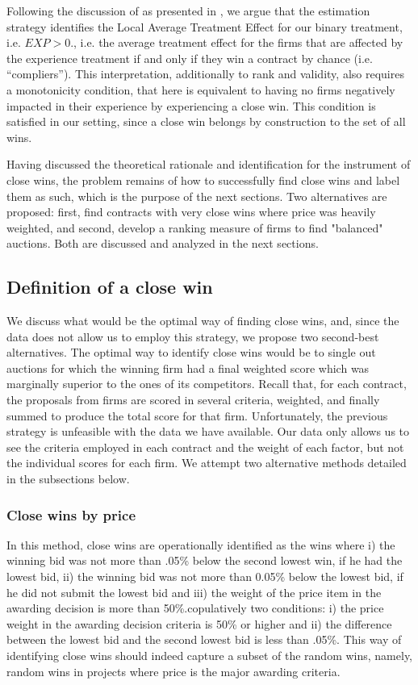  Following the discussion of \parencite{angrist1995identification} as presented in \parencite{hansen2009econometrics}, we argue that the estimation strategy identifies the Local Average Treatment Effect for our binary treatment, i.e. $EXP>0$., i.e. the average treatment effect for the firms that are affected by the experience treatment if and only if they win a contract by chance (i.e. “compliers”). This interpretation, additionally to rank and validity, also requires a monotonicity condition, that here is equivalent to having no firms negatively impacted in their experience by experiencing a close win. This condition is satisfied in our setting, since a close win belongs by construction to the set of all wins.

Having discussed the theoretical rationale and identification for the instrument of close wins, the problem remains of how to successfully find close wins and label them as such, which is the purpose of the next sections. Two alternatives are proposed: first, find contracts with very close wins where price was heavily weighted, and second, develop a ranking measure of firms to find "balanced" auctions. Both are discussed and analyzed in the next sections.

\subsection{Definition of a close win}
We discuss what would be the optimal way of finding close wins, and, since the data does not allow us to employ this strategy, we propose two second-best alternatives.
The optimal way to identify close wins would be to single out auctions for which the winning firm had a final weighted score which was marginally superior to the ones of its competitors.  Recall that, for each contract, the  proposals from firms are scored in several criteria, weighted, and finally summed to produce the total score for that firm. Unfortunately, the previous strategy is unfeasible with the data we have available. Our data only allows us to see the criteria employed in each contract and the weight of each factor, but not the individual scores for each firm. We attempt two alternative methods detailed in the subsections below.

\subsubsection{Close wins by price}
In this method, close wins are operationally identified as the wins where i) the winning bid  was not more than .05\% below the second lowest win, if he had the lowest bid, ii) the winning bid  was not more than 0.05\% below the lowest bid, if he did not submit the lowest bid and iii) the weight of the price item in the awarding decision is more than 50\%.copulatively  two conditions: i) the price weight in the awarding decision criteria is 50\% or higher and ii) the difference between the lowest bid and the second lowest bid is less than .05\%. This way of identifying close wins should indeed capture a subset of the random wins, namely, random wins in projects where price is the major awarding criteria.

